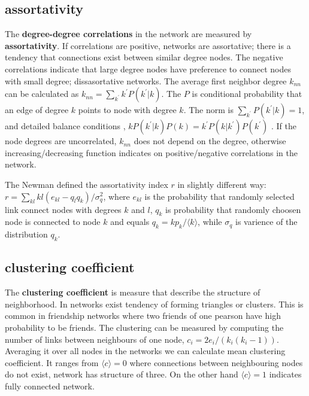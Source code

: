 \subsection{assortativity}
The \textbf{degree-degree correlations} in the network are measured by \textbf{assortativity}. If correlations are positive, networks are assortative; there is a tendency that connections exist between similar degree nodes. The negative correlations indicate that large degree nodes have preference to connect nodes with small degree; dissasortative networks. The average first neighbor degree $k_{nn}$ can be calculated as $k_{nn} = \sum_{k^{'}}k^{'}P(k^{'}|{k})$. The $P$ is conditional probability that an edge of degree $k$ points to node with degree $k$. The norm is $\sum_{k^{'}}P(k^{'}|k)=1$, and detailed balance conditions \cite{boccaletti2006},  $kP(k^{'}|k)P(k) = k^{'}P(k|k^{'})P(k^{'})$ \cite{boccaletti2006}. If the node degrees are uncorrelated, $k_{nn}$ does not depend on the degree, otherwise increasing/decreasing function indicates on positive/negative correlations in the network.

The Newman defined the assortativity index $r$ in slightly different way:
$r = \sum_{kl}kl(e_{kl} - q_lq_k) / \sigma_q^2$, where $e_{kl}$ is the probability that randomly selected link connect nodes with degrees $k$ and $l$, $q_k$ is probability that randomly choosen node is connected to node $k$ and equals $q_k = kp_k / \langle k \rangle$, while $\sigma_q$ is varience of the distribution $q_k$. 

\subsection{clustering coefficient}
The \textbf{clustering coefficient} is measure that describe the structure of neighborhood. In networks exist tendency of forming triangles or clusters. This is common in friendship networks where two friends of one pearson have high probability to be friends. The clustering can be measured by computing the number of links between neighbours of one node, $c_i=2e_i/(k_i(k_i-1))$. Averaging it over all nodes in the networks we can calculate mean clustering coefficient. It ranges from  $\langle c \rangle = 0$ where connections between neighbouring nodes do not exist, network has structure of three. On the other hand $\langle c \rangle = 1$ indicates fully connected network. 


